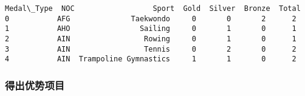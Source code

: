 \documentclass[11pt]{article}
\makeatletter
\newcommand{\boxspacing}{\kern\kvtcb@left@rule\kern\kvtcb@boxsep}
\newcommand{\prompt}[4]{
        {\ttfamily\llap{{\color{#2}[#3]:\hspace{3pt}#4}}\vspace{-\baselineskip}}
    }
\makeatother
\begin{document}
            \begin{tcolorbox}[breakable, size=fbox, boxrule=.5pt, pad at break*=1mm, opacityfill=0]
\prompt{Out}{outcolor}{142}{\boxspacing}
\begin{Verbatim}[commandchars=\\\{\}]
Medal\_Type  NOC                  Sport  Gold  Silver  Bronze  Total
0           AFG              Taekwondo     0       0       2      2
1           AHO                Sailing     0       1       0      1
2           AIN                 Rowing     0       1       0      1
3           AIN                 Tennis     0       2       0      2
4           AIN  Trampoline Gymnastics     1       1       0      2
\end{Verbatim}
\end{tcolorbox}
        
    \subsubsection{得出优势项目}\label{ux5f97ux51faux4f18ux52bfux9879ux76ee}
\end{document}
